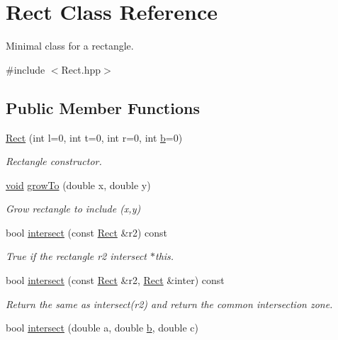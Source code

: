 \hypertarget{classRect}{}\section{Rect Class Reference}
\label{classRect}


Minimal class for a rectangle.  




{\ttfamily \#include $<$Rect.\+hpp$>$}

\subsection*{Public Member Functions}
\begin{DoxyCompactItemize}
\item 
\hyperlink{classRect_aedfa4d8b0bbfdd1ae05f7cf69d05a1c8}{Rect} (int l=0, int t=0, int r=0, int \hyperlink{jpegint_8h_af320905358fa78701e4cc60b6135601f}{b}=0)
\begin{DoxyCompactList}\small\item\em Rectangle constructor. \end{DoxyCompactList}\item 
\hyperlink{png_8h_aa8c59027f9ab2769342f248709d68d17}{void} \hyperlink{classRect_a987c08eeb48cb5f045726e40bddf87b3}{grow\+To} (double x, double y)
\begin{DoxyCompactList}\small\item\em Grow rectangle to include (x,y) \end{DoxyCompactList}\item 
bool \hyperlink{classRect_a204dd1da368cb6da259165c805e4a8e8}{intersect} (const \hyperlink{classRect}{Rect} \&r2) const 
\begin{DoxyCompactList}\small\item\em True if the rectangle r2 intersect $\ast$this. \end{DoxyCompactList}\item 
bool \hyperlink{classRect_ad3b3c0f7a346713fbcd00799391dcca5}{intersect} (const \hyperlink{classRect}{Rect} \&r2, \hyperlink{classRect}{Rect} \&inter) const 
\begin{DoxyCompactList}\small\item\em Return the same as intersect(r2) and return the common intersection zone. \end{DoxyCompactList}\item 
bool \hyperlink{classRect_ae06bc5581d6589521ec7e89c2379d6cd}{intersect} (double a, double \hyperlink{jpegint_8h_af320905358fa78701e4cc60b6135601f}{b}, double c)

\end{DoxyCompactItemize}
